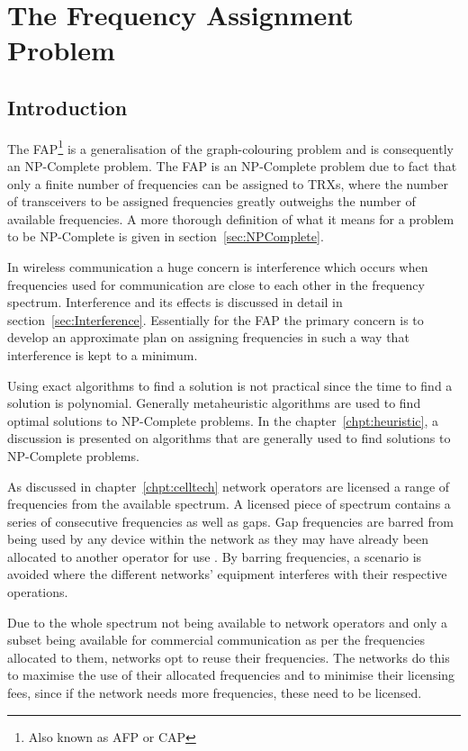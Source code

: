 \chapter{The Frequency Assignment Problem}
\label{chpt:fap}
\section{Introduction}
The \gls{FAP}\footnote{Also known as \gls{AFP} or \gls{CAP}\cite{ACOvsEA}} is a generalisation of the graph-colouring problem and is consequently an NP-Complete problem\cite{FAPRAMColouring}. The \gls{FAP} is an NP-Complete problem due to fact that only a finite number of frequencies can be assigned to \glspl{TRX}, where the number of transceivers to be assigned frequencies greatly outweighs the number of available frequencies\cite{FAPRAMColouring}. A more thorough definition of what it means for a problem to be NP-Complete is given in section~\ref{sec:NPComplete}.

In wireless communication a huge concern is interference which occurs when frequencies used for communication are close to each other in the frequency spectrum\cite{Karen2004}. Interference and its effects is discussed in detail in section~\ref{sec:Interference}. Essentially for the \gls{FAP} the primary concern is to develop an approximate plan on assigning frequencies in such a way that interference is kept to a minimum. 

Using exact algorithms to find a solution is not practical since the time to find a solution is polynomial. Generally metaheuristic algorithms are used to find optimal solutions to NP-Complete problems\cite{ACOvsEA}. In the chapter~\ref{chpt:heuristic}, a discussion is presented on algorithms that are generally used to find solutions to NP-Complete problems. 

As discussed in chapter~\ref{chpt:celltech} network operators are licensed a range of frequencies from the available spectrum. A licensed piece of spectrum contains a series of consecutive frequencies as well as gaps. Gap frequencies are barred from being used by any device within the network as they may have already been allocated to another operator for use \cite{FAPInCell}. By barring frequencies, a scenario is avoided where the different networks' equipment interferes with their respective operations\cite{FAPInCell}.

Due to the whole spectrum not being available to network operators and only a subset being available for commercial communication as per the frequencies allocated to them, networks opt to reuse their frequencies\cite{FAPInCell}. The networks do this to maximise the use of their allocated frequencies and to minimise their licensing fees, since if the network needs more frequencies, these need to be licensed\cite{FAPRAMColouring}.

